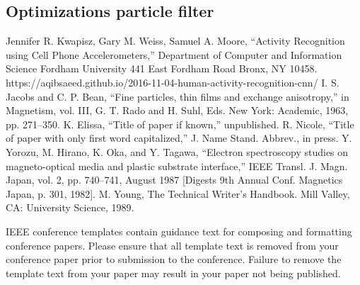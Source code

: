 \documentclass[conference]{IEEEtran}
\begin{document}
\subsection*{Optimizations particle filter}
\begin{thebibliography}{00}
 Jennifer R. Kwapisz, Gary M. Weiss, Samuel A. Moore, ``Activity Recognition using Cell Phone Accelerometers,''  Department of Computer and Information Science  Fordham University  441 East Fordham Road  Bronx, NY 10458.
https://aqibsaeed.github.io/2016-11-04-human-activity-recognition-cnn/
 I. S. Jacobs and C. P. Bean, ``Fine particles, thin films and exchange anisotropy,'' in Magnetism, vol. III, G. T. Rado and H. Suhl, Eds. New York: Academic, 1963, pp. 271--350.
 K. Elissa, ``Title of paper if known,'' unpublished.
 R. Nicole, ``Title of paper with only first word capitalized,'' J. Name Stand. Abbrev., in press.
 Y. Yorozu, M. Hirano, K. Oka, and Y. Tagawa, ``Electron spectroscopy studies on magneto-optical media and plastic substrate interface,'' IEEE Transl. J. Magn. Japan, vol. 2, pp. 740--741, August 1987 [Digests 9th Annual Conf. Magnetics Japan, p. 301, 1982].
 M. Young, The Technical Writer's Handbook. Mill Valley, CA: University Science, 1989.
\end{thebibliography}
\vspace{12pt}
\color{red}
IEEE conference templates contain guidance text for composing and formatting conference papers. Please ensure that all template text is removed from your conference paper prior to submission to the conference. Failure to remove the template text from your paper may result in your paper not being published.
\end{document}

